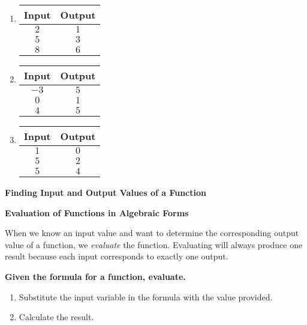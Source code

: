 \documentclass[12pt]{book}
\begin{document}
\begin{multicols}{3}

\begin{enumerate}
    \item {
        \begin{tabular}{ |c|c| } 
         \hline
         \textbf{Input} & \textbf{Output}  \\ 
           \hline
              $2$ & $1$ \\
             \hline
             $5$ & $3$ \\
             \hline
            $8$ & $6$ \\
         \hline

          \end{tabular} }
    \item {
\begin{tabular}{ |c|c| } 
 \hline
 \textbf{Input} & \textbf{Output}  \\ 
    \hline
    $-3$ & $5$ \\
    \hline
    $0$ & $1$ \\
     \hline
    $4$ & $5$ \\
    \hline
\end{tabular} 
}

\item {
\begin{tabular}{ |c|c| } 
 \hline
 \textbf{Input} & \textbf{Output}  \\ 
    \hline
    $1$ & $0$ \\
    \hline
    $5$ & $2$ \\
     \hline
    $5$ & $4$ \\
    \hline
\end{tabular} 
}
\end{enumerate}
\end{multicols}
\newpage

{\large \textbf{Finding Input and Output Values of a Function}}

\textbf{Evaluation of Functions in Algebraic Forms}

When we know an input value and want to determine the corresponding output value of a function, we \textit{evaluate} the function. Evaluating will always produce one result because each input corresponds to exactly one output.
\\

\begin{boxR}
  \textbf{  Given the formula for a function, evaluate.}
\vspace{1mm}
\hline
\vspace{2mm}
\begin{enumerate}
    \item Substitute the input variable in the formula with the value provided.
    \item Calculate the result.
\end{enumerate}
\end{boxR}
\end{document}
